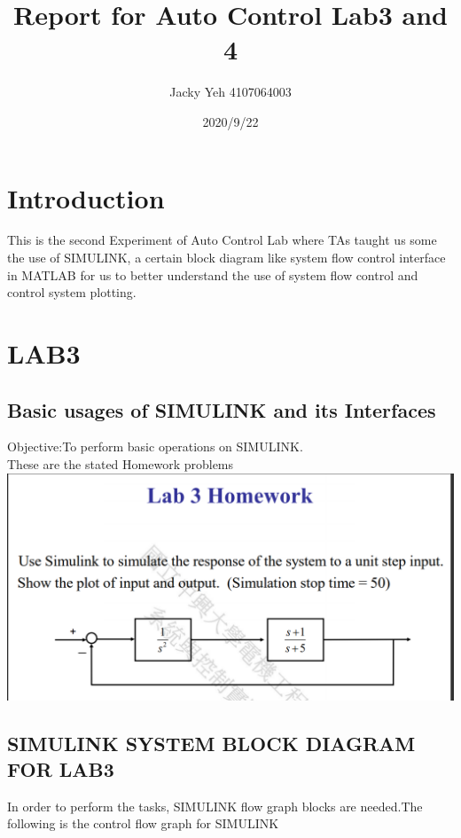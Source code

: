\documentclass[12pt]{article}
\title{Report for Auto Control Lab3 and 4}
\date{2020/9/22}
\author{Jacky Yeh 4107064003}
\begin{document}
\begin{titlepage}

\maketitle
\end{titlepage}


\section{Introduction}
This is the second Experiment of Auto Control Lab where TAs taught us some the use of SIMULINK, a certain block diagram like system flow control interface in MATLAB for us to better understand the use of system flow control and control system plotting.\\

\section{LAB3}
\subsection{Basic usages of SIMULINK and its Interfaces}
Objective:To perform basic operations on SIMULINK.\\
These are the stated Homework problems\\
\includegraphics[scale=0.6]{../Lab3,4/HW for lab 3,4/LAB3/LAB3 HW.png}
\cleardoublepage 

\subsection{SIMULINK SYSTEM BLOCK DIAGRAM FOR LAB3}
In order to perform the tasks, SIMULINK flow graph blocks are needed.The following is the control flow graph for SIMULINK\\
\end{document}
